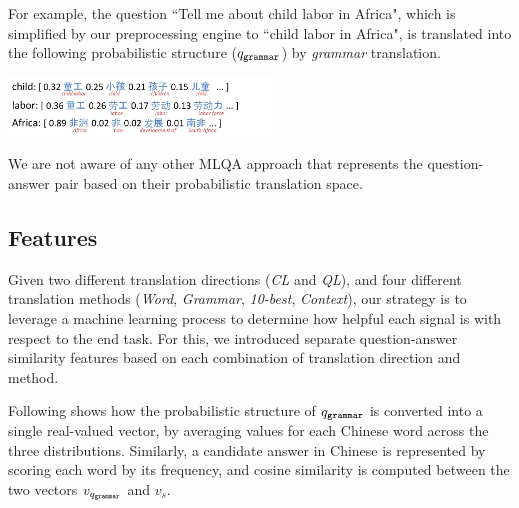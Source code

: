 \documentclass{sig-alternate-05-2015}
\newcommand{\red}[1]{\textcolor{red}{#1}}
\begin{document}
\vspace{-0.25cm}
For example, the question ``Tell me about child 
labor in Africa", which is simplified by our preprocessing engine to ``child labor in Africa", is translated into the following 
probabilistic structure ($q_{{\tt grammar}}$) by \emph{grammar} translation.

\includegraphics[width=7cm]{example.pdf}

We are not aware of any other MLQA approach that represents the question-answer pair based on their probabilistic translation
space.
 
\subsection{Features}\label{sec:feat}


Given two different translation directions (\emph{CL} and \emph{QL}), and four different translation methods (\emph{Word}, 
\emph{Grammar}, \emph{10-best}, \emph{Context}), our strategy is to leverage a machine learning process to determine how 
helpful each signal is with respect to the end task. For this, we introduced separate question-answer similarity features based 
on each combination of translation direction and method. 

Following shows how the probabilistic structure of $q_{{\tt grammar}}$ is converted into a single real-valued vector,
by averaging values for each Chinese word across the three distributions.
Similarly, a candidate answer in Chinese is represented by scoring each word by its frequency, and cosine similarity
is computed between the two vectors $v_{q_{{\tt grammar}}}$ and $v_s$.
\end{document}
